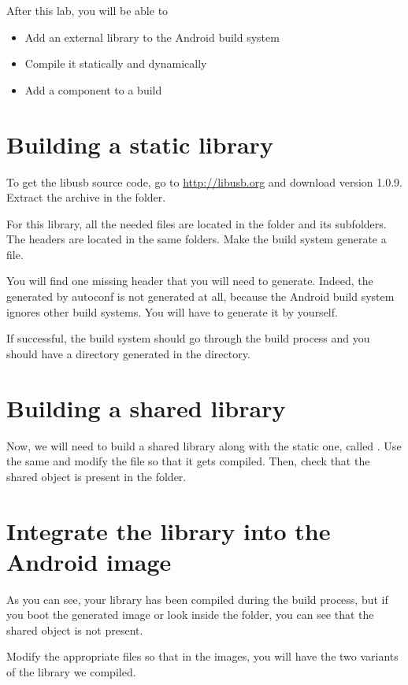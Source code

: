 
After this lab, you will be able to
\begin{itemize}
  \item Add an external library to the Android build system
  \item Compile it statically and dynamically
  \item Add a component to a build
\end{itemize}

\section{Building a static library}

To get the libusb source code, go to \url{http://libusb.org} and
download version 1.0.9. Extract the archive in the
 folder.

For this library, all the needed  files are located in the
 folder and its subfolders. The headers are located in
the same folders. Make the build system generate a
 file.

You will find one missing header that you will need to
generate. Indeed, the  generated by autoconf is not
generated at all, because the Android build system ignores other build
systems. You will have to generate it by yourself.

If successful, the build system should go through the build process
and you should have a directory generated in the  directory.

\section{Building a shared library}

Now, we will need to build a shared library along with the static one,
called . Use the same  and modify the
 file so that it gets compiled. Then, check that the
shared object is present in the  folder.

\section{Integrate the library into the Android image}

As you can see, your library has been compiled during the build
process, but if you boot the generated image or look inside the
 folder, you can see that
the shared object is not present.

Modify the appropriate files so that in the images, you will have the
two variants of the library we compiled.
